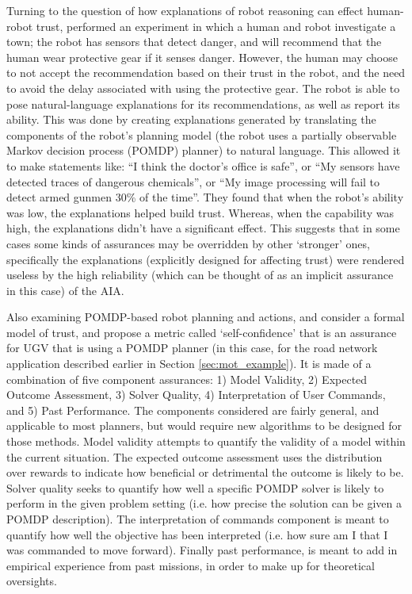Turning to the question of how explanations of robot reasoning can effect human-robot trust, \citet{Wang2016-id} performed an experiment in which a human and robot investigate a town; the robot has sensors that detect danger, and will recommend that the human wear protective gear if it senses danger. However, the human may choose to not accept the recommendation based on their trust in the robot, and the need to avoid the delay associated with using the protective gear. The robot is able to pose natural-language explanations for its recommendations, as well as report its ability. This was done by creating explanations generated by translating the components of the robot's planning model (the robot uses a partially observable Markov decision process (POMDP) planner) to natural language. This allowed it to make statements like: ``I think the doctor's office is safe'', or ``My sensors have detected traces of dangerous chemicals'', or ``My image processing will fail to detect armed gunmen 30\% of the time''. They found that when the robot's ability was low, the explanations helped build trust. Whereas, when the capability was high, the explanations didn't have a significant effect. This suggests that in some cases some kinds of assurances may be overridden by other `stronger' ones, specifically the explanations (explicitly designed for affecting trust) were rendered useless by the high reliability (which can be thought of as an implicit assurance in this case) of the AIA.

Also examining POMDP-based robot planning and actions, \citet{Aitken2016-fb} and \citet{Aitken2016-cv} consider a formal model of trust, and propose a metric called `self-confidence' that is an assurance for UGV that is using a  POMDP planner (in this case, for the road network application described earlier in Section \ref{sec:mot_example}). It is made of a combination of five component assurances: 1) Model Validity, 2) Expected Outcome Assessment, 3) Solver Quality, 4) Interpretation of User Commands, and 5) Past Performance. The components considered are fairly general, and applicable to most planners, but would require new algorithms to be designed for those methods. Model validity attempts to quantify the validity of a model within the current situation. The expected outcome assessment uses the distribution over rewards to indicate how beneficial or detrimental the outcome is likely to be. Solver quality seeks to quantify how well a specific POMDP solver is likely to perform in the given problem setting (i.e. how precise the solution can be given a POMDP description). The interpretation of commands component is meant to quantify how well the objective has been interpreted (i.e. how sure am I that I was commanded to move forward). Finally past performance, is meant to add in empirical experience from past missions, in order to make up for theoretical oversights.

